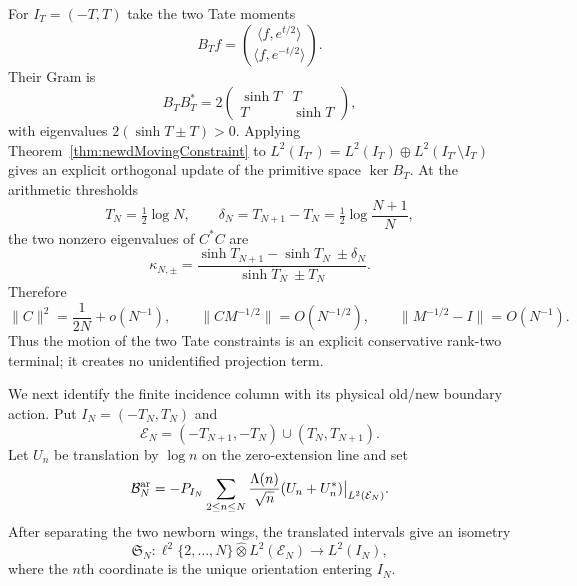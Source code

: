 For $I_T=(-T,T)$ take the two Tate moments
\begin{equation}\label{eq:newdTateMomentMap}
 B_Tf=
 \binom{\langle f,e^{t/2}\rangle}{\langle f,e^{-t/2}\rangle}.
\end{equation}
Their Gram is
\begin{equation}\label{eq:newdTateGram}
 B_TB_T^*=2
 \begin{pmatrix}\sinh T&T\\T&\sinh T\end{pmatrix},
\end{equation}
with eigenvalues $2(\sinh T\pm T)>0$.  Applying
Theorem~\ref{thm:newdMovingConstraint} to
$L^2(I_{T'})=L^2(I_T)\oplus L^2(I_{T'}\setminus I_T)$ gives an explicit
orthogonal update of the primitive space $\ker B_T$.  At the arithmetic
thresholds
\[
 T_N=\tfrac12\log N,
 \qquad
 \delta_N=T_{N+1}-T_N=\tfrac12\log\frac{N+1}{N},
\]
the two nonzero eigenvalues of $C^*C$ are
\begin{equation}\label{eq:newdTateReturnEigenvalues}
 \kappa_{N,\pm}=
 \frac{\sinh T_{N+1}-\sinh T_N\ \pm\delta_N}
      {\sinh T_N\ \pm T_N}.
\end{equation}
Therefore
\begin{equation}\label{eq:newdTateReturnDecay}
 \|C\|^2=\frac1{2N}+o(N^{-1}),
 \qquad
 \|CM^{-1/2}\|=O(N^{-1/2}),
 \qquad
 \|M^{-1/2}-I\|=O(N^{-1}).
\end{equation}
Thus the motion of the two Tate constraints is an explicit conservative
rank-two terminal; it creates no unidentified projection term.

We next identify the finite incidence column with its physical
old/new boundary action.  Put $I_N=(-T_N,T_N)$ and
\[
 \mathcal E_N=
 (-T_{N+1},-T_N)\cup(T_N,T_{N+1}).
\]
Let $U_n$ be translation by $\log n$ on the zero-extension line and set
\begin{equation}\label{eq:newdPhysicalIncidence}
 \mathcal B_N^{\rm ar}
 =-P_{I_N}\sum_{2\leq n\leq N}
       \frac{\Lambda(n)}{\sqrt n}(U_n+U_n^*)
       \big|_{L^2(\mathcal E_N)}.
\end{equation}
After separating the two newborn wings, the translated intervals give an
isometry
\[
 \mathfrak S_N:
 \ell^2\{2,\ldots,N\}\widehat\otimes L^2(\mathcal E_N)
 \longrightarrow L^2(I_N),
\]
where the $n$th coordinate is the unique orientation entering $I_N$.

